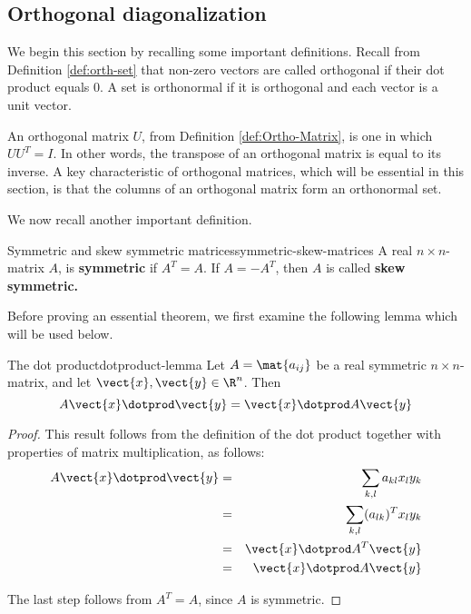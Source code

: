 \subsection{Orthogonal diagonalization}

We begin this section by recalling some important definitions. Recall from Definition \ref{def:orth-set} that non-zero vectors are called orthogonal if their dot product equals $0$.  A set is orthonormal if it is orthogonal and each vector is a unit vector. 

An orthogonal matrix $U$, from Definition \ref{def:Ortho-Matrix}, is one in which $UU^{T} = I$. In other words, the transpose of an orthogonal matrix is equal to its inverse. A key characteristic of orthogonal matrices, which will be essential in this section, is that the columns of an orthogonal matrix form an orthonormal set. 

We now recall another important definition. 

\begin{definition}{Symmetric and skew symmetric matrices}{symmetric-skew-matrices}
A real $n\times n$-matrix $A$, is \textbf{symmetric }if $A^{T}=A$. If $%
A=-A^{T}$, then $A$ is called \textbf{skew symmetric. }
\end{definition}

Before proving an essential theorem, we first examine the following lemma which will be used below.

\begin{lemma}{The dot product}{dotproduct-lemma}
Let $A=\mat{a_{ij} }$ be a real symmetric $n \times n$-matrix, and let $\vect{x}, \vect{y} \in \R^n$. Then
\[
A\vect{x} \dotprod \vect{y} = \vect{x} \dotprod A \vect{y}
\]
\end{lemma}

\begin{proof}
This result follows from the definition of the dot product together with properties of matrix multiplication, as follows:
\begin{eqnarray*}
A\vect{x} \dotprod \vect{y} &=& \sum_{k,l}a_{kl}x_{l}y_{k} \\
&=&\sum_{k,l} (a_{lk})^Tx_{l}y_{k} \\
&=& \vect{x}\dotprod A^{T}\vect{y} \\
&=& \vect{x}\dotprod A \vect{y}
\end{eqnarray*}

The last step follows from $A^T = A$, since $A$ is symmetric. 
\end{proof}

